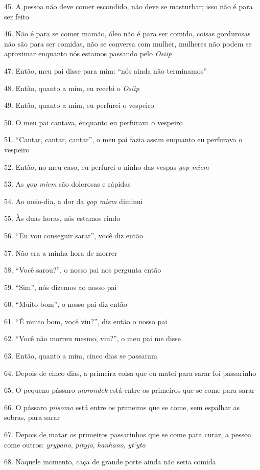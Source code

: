 45. A pessoa não deve comer escondido, não deve se masturbar; isso não é
para ser feito

46. Não é para se comer mamão, óleo não é para ser comido, coisas
gordurosas não são para ser comidas, não se conversa com mulher,
mulheres não podem se aproximar enquanto nós estamos passando pelo
\emph{Osiip}

47. Então, meu pai disse para mim: ``nós ainda não terminamos''

48. Então, quanto a mim, eu recebi o \emph{Osiip}

49. Então, quanto a mim, eu perfurei o vespeiro

50. O meu pai cantava, enquanto eu perfurava o vespeiro

51. ``Cantar, cantar, cantar'', o meu pai fazia assim enquanto eu
perfurava o vespeiro

52. Então, no meu caso, eu perfurei o ninho das vespas \emph{gop miem}

53. As \emph{gop miem} são dolorosas e rápidas

54. Ao meio-dia, a dor da \emph{gop miem} diminui

55. Às duas horas, nós estamos rindo

56. ``Eu vou conseguir sarar'', você diz então

57. Não era a minha hora de morrer

58. ``Você sarou?'', o nosso pai nos pergunta então

59. ``Sim'', nós dizemos ao nosso pai

60. ``Muito bom'', o nosso pai diz então

61. ``É muito bom, você viu?'', diz então o nosso pai

62. ``Você não morreu mesmo, viu?'', o meu pai me disse

63. Então, quanto a mim, cinco dias se passaram

64. Depois de cinco dias, a primeira coisa que eu matei para sarar foi
passarinho

65. O pequeno pássaro \emph{morondek} está entre os primeiros que se come
para sarar

66. O pássaro \emph{piisomo} está entre os primeiros que se come, sem
espalhar as sobras, para sarar

67. Depois de matar os primeiros passarinhos que se come para curar, a
pessoa come outros: \emph{yrypano}, \emph{pityjo}, \emph{hanhano},
\emph{yt'yto}

68. Naquele momento, caça de grande porte ainda não seria comida

